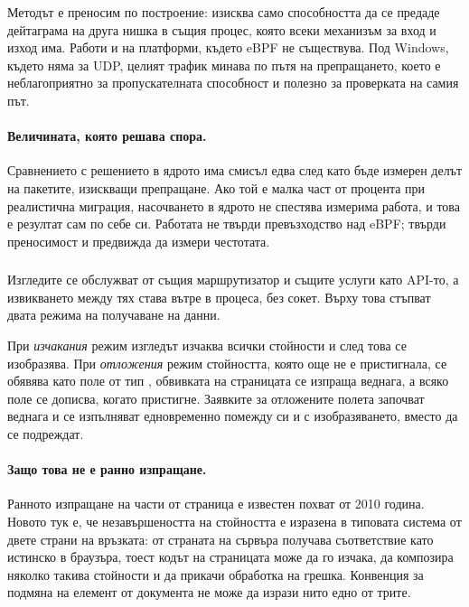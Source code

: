 Методът е преносим по построение: изисква само способността да се предаде дейтаграма на друга
нишка в същия процес, която всеки механизъм за вход и изход има. Работи и на платформи, където
eBPF не съществува. Под Windows, където няма  за UDP, целият трафик минава
по пътя на препращането, което е неблагоприятно за пропускателната способност и полезно за
проверката на самия път.

\paragraph{Величината, която решава спора.} Сравнението с решението в ядрото има смисъл едва
след като бъде измерен делът на пакетите, изискващи препращане. Ако той е малка част от
процента при реалистична миграция, насочването в ядрото не спестява измерима работа, и това е
резултат сам по себе си. Работата не твърди превъзходство над eBPF; твърди преносимост и
предвижда да измери честотата.

\subsubsection*{}

Изгледите се обслужват от същия маршрутизатор и същите услуги като API-то, а извикването
между тях става вътре в процеса, без сокет. Върху това стъпват двата режима на получаване на
данни.

При \emph{изчакания} режим изгледът изчаква всички стойности и след това се изобразява. При
\emph{отложения} режим стойността, която още не е пристигнала, се обявява като поле от тип
, обвивката на страницата се изпраща веднага, а всяко поле се дописва,
когато пристигне. Заявките за отложените полета започват веднага и се изпълняват едновременно
помежду си и с изобразяването, вместо да се подреждат.

\paragraph{Защо това не е ранно изпращане.} Ранното изпращане на части от страница е известен
похват от 2010 година. Новото тук е, че незавършеността на стойността е изразена в типовата
система от двете страни на връзката:  от страната на сървъра получава
съответствие като истинско  в браузъра, тоест кодът на страницата може да го
изчака, да композира няколко такива стойности и да прикачи обработка на грешка. Конвенция за
подмяна на елемент от документа не може да изрази нито едно от трите.

